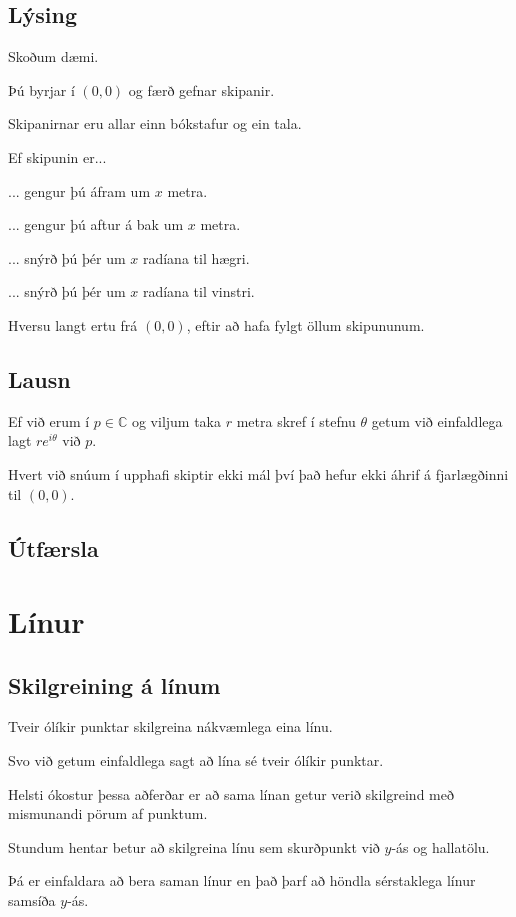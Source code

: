\subsection{Lýsing}
{
    {
        \item<1-> Skoðum dæmi.
        \item<2-> Þú byrjar í $(0, 0)$ og færð gefnar skipanir.
        \item<3-> Skipanirnar eru allar einn bókstafur og ein tala.
        \item<4-> Ef skipunin er...
        {
            \item<5-> ... gengur þú áfram um $x$ metra.
            \item<6-> ... gengur þú aftur á bak um $x$ metra.
            \item<7-> ... snýrð þú þér um $x$ radíana til hægri.
            \item<8-> ... snýrð þú þér um $x$ radíana til vinstri.
        }
        \item<9-> Hversu langt ertu frá $(0, 0)$, eftir að hafa fylgt öllum skipununum.
    }
}

\subsection{Lausn}
{
    {
        \item<1-> Ef við erum í $p \in \mathbb{C}$ og viljum taka $r$ metra skref í stefnu $\theta$ getum við einfaldlega lagt $re^{i\theta}$ við $p$.
        \item<2-> Hvert við snúum í upphafi skiptir ekki mál því það hefur ekki áhrif á fjarlægðinni til $(0, 0)$.
    }
}

\subsection{Útfærsla}
{
}

\section{Línur}
\subsection{Skilgreining á línum}
{
    {
        \item<1-> Tveir ólíkir punktar skilgreina nákvæmlega eina línu.
        \item<2-> Svo við getum einfaldlega sagt að lína sé tveir ólíkir punktar.
        \item<3-> Helsti ókostur þessa aðferðar er að sama línan getur verið skilgreind með mismunandi pörum af punktum.
        \item<4-> Stundum hentar betur að skilgreina línu sem skurðpunkt við $y$-ás og hallatölu. 
        \item<5-> Þá er einfaldara að bera saman línur en það þarf að höndla sérstaklega línur samsíða $y$-ás.
    }
}

